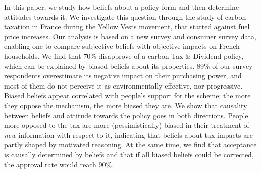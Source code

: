 \documentclass[12pt]{article} %
\begin{document}

In this paper, we study how beliefs about a policy form and then determine attitudes towards it. We investigate this question through the study of carbon taxation in France during the Yellow Vests movement, that started against fuel price increases. Our analysis is based on a new survey and consumer survey data, enabling one to compare subjective beliefs with objective impacts on French households. We find that 70\% disapprove of a carbon Tax \& Dividend policy, which can be explained by biased beliefs about its properties. 89\% of our survey respondents overestimate its negative impact on their purchasing power, and most of them do not perceive it as environmentally effective, nor progressive. Biased beliefs appear correlated with people’s support for the scheme: the more they oppose the mechanism, the more biased they are. We show that causality between beliefs and attitude towards the policy goes in both directions. People more opposed to the tax are more (pessimistically) biased in their treatment of \textit{new} information with respect to it, indicating that beliefs about tax impacts are partly shaped by motivated reasoning. At the same time, we find that acceptance is causally determined by beliefs and that if all biased beliefs could be corrected, the approval rate would reach 90\%.
\end{document}
